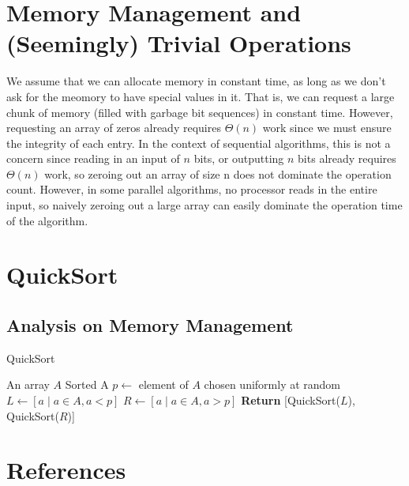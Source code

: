 \documentclass[11pt]{article}
\begin{document}
\section{Memory Management and (Seemingly) Trivial Operations}
\label{sec:orgd579bba}
We assume that we can allocate memory in constant time, as long as we don't ask for the meomory
to have special values in it.  That is, we can request a large chunk of memory (filled with
garbage bit sequences) in constant time. However, requesting an array of zeros already
requires \(\Theta(n)\) work since we must ensure the integrity of each entry. In the context of
sequential algorithms, this is not a concern since reading in an input of \(n\) bits, or
outputting \(n\) bits already requires \(\Theta(n)\) work, so zeroing out an array of size n does not
dominate the operation count. However, in some parallel algorithms, no processor reads in the
entire input, so naively zeroing out a large array can easily dominate the operation time of the
algorithm.
\section{QuickSort}
\label{sec:orgb996174}
\subsection{Analysis on Memory Management}
\label{sec:orgb475a88}
\begin{algorithm}
\caption{QuickSort}
\begin{algorithmic}[1]
\Require An array \(A\)
\Ensure Sorted A
\State \(p\leftarrow\) element of \(A\) chosen uniformly at random
\State \(L\leftarrow[a\mid a\in A,a<p]\)
\State \(R\leftarrow[a\mid a\in A,a>p]\)
\State \textbf{Return} [QuickSort(\(L\)), QuickSort(\(R\))]
\end{algorithmic}
\end{algorithm}

\section{References}
\label{sec:org64d08a1}
\label{bibliographystyle link}


\label{bibliography link}

\end{document}
